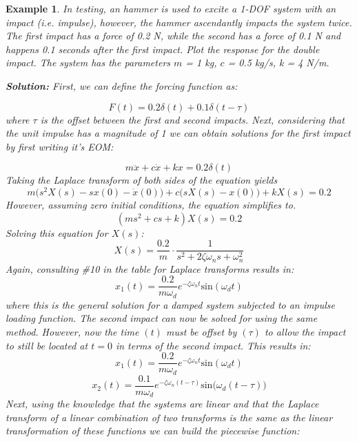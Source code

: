 \documentclass[12pt,letter]{article}
\newtheorem{ex}{Example}
\numberwithin{ex}{section} %
\newenvironment{example}{\begin{mdframed}[middlelinewidth=0.5mm]\begin{ex}\normalfont}{\end{ex}\end{mdframed}}
\numberwithin{re}{section} %
\begin{document}
\begin{example}


In testing, an hammer is used to excite a 1-DOF system with an impact (i.e. impulse), however, the hammer ascendantly impacts the system twice. The first impact has a force of 0.2 N, while the second has a force of 0.1 N and happens 0.1 seconds after the first impact. Plot the response for the double impact. The system has the parameters $m$ = 1 kg, $c$ = 0.5 kg/s, k = 4 N/m. 

\noindent\textbf{Solution:} First, we can define the forcing function as:

\begin{equation}
	F(t) = 0.2 \delta (t) + 0.1 \delta(t-\tau)
\end{equation}
where $\tau$ is the offset between the first and second impacts. Next, considering that the unit impulse has a magnitude of 1 we can obtain solutions for the first impact by first writing it's EOM:

\begin{equation}
m\ddot{x} +c\dot{x} +kx =0.2 \delta(t)
\end{equation}
Taking the Laplace transform of both sides of the equation yields 
\begin{equation}
m\big(s^2X(s)-sx(0) - \dot{x}(0)\big) + c\big(sX(s)-x(0)\big) +kX(s) = 0.2
\end{equation}
However, assuming zero initial conditions, the equation simplifies to. 
\begin{equation}
(ms^2 + cs +k)X(s) = 0.2
\end{equation}
Solving this equation for $X(s)$:
\begin{equation}
X(s) = \frac{0.2}{m} \cdot \frac{1}{s^2 + 2 \zeta \omega_n s + \omega_n^2}
\end{equation}
Again, consulting \#10 in the table for Laplace transforms results in:
\begin{equation}
x_1(t) = \frac{0.2}{m \omega_d} e^{-\zeta \omega_n t} \text{sin}(\omega_dt)
\end{equation}
where this is the general solution for a damped system subjected to an impulse loading function. The second impact can now be solved for using the same method. However, now the time $(t)$ must be offset by $(\tau)$ to allow the impact to still be located at $t=0$ in terms of the second impact. This results in:
\begin{equation}
	x_1(t) = \frac{0.2}{m \omega_d} e^{-\zeta \omega_n t} \text{sin}(\omega_dt)
\end{equation}
\begin{equation}
	x_2(t) = \frac{0.1}{m \omega_d} e^{-\zeta \omega_n (t-\tau)} \text{sin}\big(\omega_d(t-\tau)\big)
\end{equation}
Next, using the knowledge that the systems are linear and that the Laplace transform of a linear combination of two transforms is the same as the linear transformation of these functions we can build the piecewise function:


\end{example}
\end{document}
